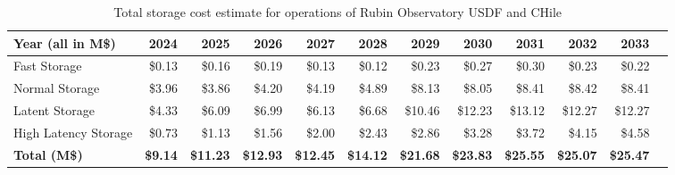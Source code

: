 \tiny \begin{longtable} { |p{}  |r  |r  |r  |r  |r  |r  |r  |r  |r  |r  |r |} 
\caption{Total storage cost estimate for operations of Rubin Observatory USDF and CHile \label{tab:opsStorageCost}}\\ 
\hline 
\textbf{Year (all in M\$)}&\textbf{2024}&\textbf{2025}&\textbf{2026}&\textbf{2027}&\textbf{2028}&\textbf{2029}&\textbf{2030}&\textbf{2031}&\textbf{2032}&\textbf{2033} \\ \hline
{Fast Storage}&{\$0.13}&{\$0.16}&{\$0.19}&{\$0.13}&{\$0.12}&{\$0.23}&{\$0.27}&{\$0.30}&{\$0.23}&{\$0.22} \\ \hline
{Normal Storage}&{\$3.96}&{\$3.86}&{\$4.20}&{\$4.19}&{\$4.89}&{\$8.13}&{\$8.05}&{\$8.41}&{\$8.42}&{\$8.41} \\ \hline
{Latent Storage}&{\$4.33}&{\$6.09}&{\$6.99}&{\$6.13}&{\$6.68}&{\$10.46}&{\$12.23}&{\$13.12}&{\$12.27}&{\$12.27} \\ \hline
{High Latency Storage}&{\$0.73}&{\$1.13}&{\$1.56}&{\$2.00}&{\$2.43}&{\$2.86}&{\$3.28}&{\$3.72}&{\$4.15}&{\$4.58} \\ \hline
\textbf{Total (M\$)}&\textbf{\$9.14}&\textbf{\$11.23}&\textbf{\$12.93}&\textbf{\$12.45}&\textbf{\$14.12}&\textbf{\$21.68}&\textbf{\$23.83}&\textbf{\$25.55}&\textbf{\$25.07}&\textbf{\$25.47} \\ \hline
\end{longtable} \normalsize

